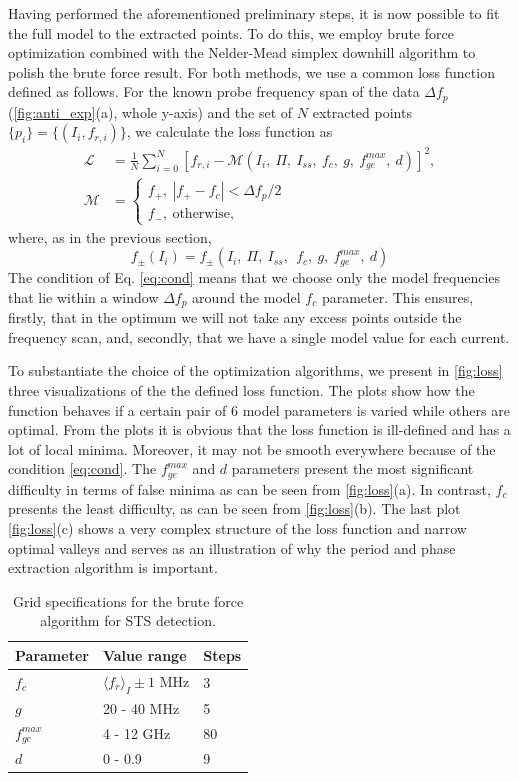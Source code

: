 \documentclass[%
 aip,
 draft,
 amsmath,amssymb,
 reprint,%
]{revtex4-1}
\begin{document}
Having performed the aforementioned preliminary steps, it is now possible to fit the full model to the extracted points. To do this, we employ brute force optimization combined with the Nelder-Mead simplex downhill algorithm\cite{nelder1965} to polish the brute force result. For both methods, we use a common loss function defined as follows. For the known probe frequency span of the data $\Delta f_p$ (\autoref{fig:anti_exp}(a), whole y-axis) and the set of $N$ extracted points $\{p_i\} = \{(I_i, f_{r,i})\}$, we calculate the loss function as
\begin{align}
\mathcal{L} &= \frac{1}{N}\sum_{i=0}^N [f_{r,i} - \mathcal{M}(I_i,\ \Pi, \ I_{ss},\ f_c,\ g,\ f_{ge}^{max},\ d)]^2,\label{eq:loss}\\
\mathcal{M} &= \begin{cases}
f_+,\  |f_+ - f_c|< \Delta f_p/2 \\
f_-,\ \text{otherwise}, \label{eq:cond}
\end{cases}
\end{align}
where, as in the previous section, $$f_{\pm}(I_i) = f_{\pm}(I_i,\ \Pi,\ I_{ss},\ \ f_c,\ g,\ f_{ge}^{max},\ d)$$
The condition of Eq. \eqref{eq:cond} means that we choose only the model frequencies that lie within a window $\Delta f_p$ around the model $f_c$ parameter. This ensures, firstly, that in the optimum we will not take any excess points outside the frequency scan, and, secondly, that we have a single model value for each current.

To substantiate the choice of the optimization algorithms, we present in \autoref{fig:loss} three visualizations of the the defined loss function. The plots show how the function behaves if a certain pair of 6 model parameters is varied while others are optimal. From the plots it is obvious that the loss function is ill-defined and has a lot of local minima. Moreover, it may not be smooth everywhere because of the condition \eqref{eq:cond}. The $f^{max}_{ge}$ and $d$ parameters present the most significant difficulty in terms of false minima as can be seen from \autoref{fig:loss}(a). In contrast, $f_c$ presents the least difficulty, as can be seen from \autoref{fig:loss}(b). The last plot \autoref{fig:loss}(c) shows a very complex structure of the loss function and narrow optimal valleys and serves as an illustration of why the period and phase extraction algorithm is important.

\begin{table}
	\centering
	\begin{ruledtabular}
		\begin{tabular}{lll} 
			Parameter & Value range & Steps \\ 
			\hline
			$f_c$ & $\langle f_r \rangle_{I} \pm 1$ MHz & 3\\ 
			$g$ & 20 - 40 MHz & 5\\
			$f_{ge}^{max}$ &  4 - 12 GHz & 80 \\
			$d$& 0 - 0.9 & 9
		\end{tabular} 
	\end{ruledtabular}
	\caption{Grid specifications for the brute force algorithm for STS detection.}
	\label{tab:grid}
\end{table}
\end{document}
